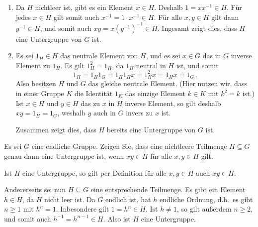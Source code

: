 \begin{solution}
  \begin{enumerate}
    \item
      Da $H$ nichtleer ist, gibt es ein Element $x \in H$.
      Deshalb $1 = x x^{-1} \in H$.
      Für jedes $x \in H$ gilt somit auch $x^{-1} = 1 \cdot x^{-1} \in H$.
      Für alle $x, y \in H$ gilt dann $y^{-1} \in H$, und somit auch $xy = x (y^{-1})^{-1} \in H$.
      Ingesamt zeigt dies, dass $H$ eine Untergruppe von $G$ ist.
    \item
      Es sei $1_H \in H$ das neutrale Element von $H$, und es sei $x \in G$ das in $G$ inverse Element zu $1_H$.
      Es gilt $1_H^2 = 1_H$, da $1_H$ neutral in $H$ ist, und somit
      \[
          1_H
        = 1_H 1_G
        = 1_H 1_H x
        = 1_H^2 x
        = 1_H x
        = 1_G \,.
      \]
      Also besitzen $H$ und $G$ das gleiche neutrale Element.
      (Hier nutzen wir, dass in einer Gruppe $K$ die Identität $1_K$ das einzige Element $k \in K$ mit $k^2 = k$ ist.)
      Ist $x \in H$ und $y \in H$ das zu $x$ in $H$ inverse Element, so gilt deshalb $xy = 1_H = 1_G$, weshalb $y$ auch in $G$ invers zu $x$ ist.
      
      Zusammen zeigt dies, dass $H$ bereits eine Untergruppe von $G$ ist.
  \end{enumerate}
\end{solution}



\begin{question}[subtitle = Untergruppen von endlichen Gruppen]
  Es sei $G$ eine endliche Gruppe.
  Zeigen Sie, dass eine nichtleere Teilmenge $H \subseteq G$ genau dann eine Untergruppe ist, wenn $xy \in H$ für alle $x,y \in H$ gilt.
\end{question}


\begin{solution}
  Ist $H$ eine Untergruppe, so gilt per Definition für alle $x, y \in H$ auch $xy \in H$.
  
  Andererseits sei nun $H \subseteq G$ eine entsprechende Teilmenge.
  Es gibt ein Element $h \in H$, da $H$ nicht leer ist.
  Da $G$ endlich ist, hat $h$ endliche Ordnung, d.h.\ es gibt $n \geq 1$ mit $h^n = 1$.
  Inbesondere gilt $1 = h^n \in H$.
  Ist $h \neq 1$, so gilt außerdem $n \geq 2$, und somit auch $h^{-1} = h^{n-1} \in H$.
  Also ist $H$ eine Untergruppe.
\end{solution}


